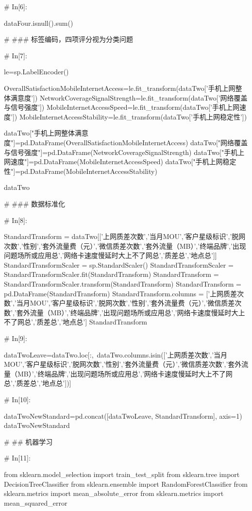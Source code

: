 \documentclass{MathorCupmodeling}
\begin{document}
\begin{python}
# In[6]:


dataFour.isnull().sum()


# ### 标签编码，四项评分视为分类问题

# In[7]:


le=sp.LabelEncoder()

OverallSatisfactionMobileInternetAccess=le.fit_transform(dataTwo['手机上网整体满意度'])
NetworkCoverageSignalStrength=le.fit_transform(dataTwo['网络覆盖与信号强度'])
MobileInternetAccessSpeed=le.fit_transform(dataTwo['手机上网速度'])
MobileInternetAccessStability=le.fit_transform(dataTwo['手机上网稳定性'])

dataTwo["手机上网整体满意度"]=pd.DataFrame(OverallSatisfactionMobileInternetAccess)
dataTwo["网络覆盖与信号强度"]=pd.DataFrame(NetworkCoverageSignalStrength)
dataTwo["手机上网速度"]=pd.DataFrame(MobileInternetAccessSpeed)
dataTwo["手机上网稳定性"]=pd.DataFrame(MobileInternetAccessStability)

dataTwo


# ### 数据标准化

# In[8]:


StandardTransform = dataTwo[['上网质差次数','当月MOU','客户星级标识','脱网次数','性别','套外流量费（元）','微信质差次数','套外流量（MB）','终端品牌','出现问题场所或应用总','网络卡速度慢延时大上不了网总','质差总','地点总']]
StandardTransformScaler = sp.StandardScaler()
StandardTransformScaler = StandardTransformScaler.fit(StandardTransform)
StandardTransform = StandardTransformScaler.transform(StandardTransform)
StandardTransform = pd.DataFrame(StandardTransform)
StandardTransform.columns = ['上网质差次数','当月MOU','客户星级标识','脱网次数','性别','套外流量费（元）','微信质差次数','套外流量（MB）','终端品牌','出现问题场所或应用总','网络卡速度慢延时大上不了网总','质差总','地点总']
StandardTransform


# In[9]:


dataTwoLeave=dataTwo.loc[:,~dataTwo.columns.isin(['上网质差次数','当月MOU','客户星级标识','脱网次数','性别','套外流量费（元）','微信质差次数','套外流量（MB）','终端品牌','出现问题场所或应用总','网络卡速度慢延时大上不了网总','质差总','地点总'])]


# In[10]:


dataTwoNewStandard=pd.concat([dataTwoLeave, StandardTransform], axis=1)
dataTwoNewStandard


# ## 机器学习

# In[11]:


from sklearn.model_selection import train_test_split
from sklearn.tree import DecisionTreeClassifier
from sklearn.ensemble import RandomForestClassifier
from sklearn.metrics import mean_absolute_error
from sklearn.metrics import mean_squared_error



\end{python}
\end{document}
